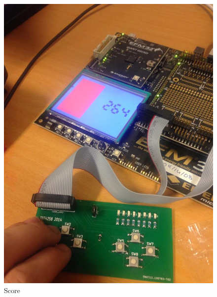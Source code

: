 \begin{figure}[ht!]
    \begin{center}
    \includegraphics[width=1\textwidth]{assets/img/stacked2.jpg}
    \caption{Score}
    \label{fig:score}
    \end{center}
\end{figure}
